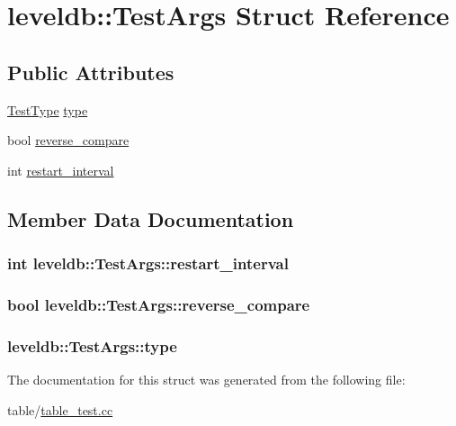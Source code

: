 \hypertarget{structleveldb_1_1_test_args}{\section{leveldb\-:\-:Test\-Args Struct Reference}
\label{structleveldb_1_1_test_args}
}
\subsection*{Public Attributes}
\begin{DoxyCompactItemize}
\item 
\hyperlink{namespaceleveldb_aefcb8349b9101fe6eeff98a1682f1342}{Test\-Type} \hyperlink{structleveldb_1_1_test_args_a1c2c14e2506bf6c238a2685c38eb16ac}{type}
\item 
bool \hyperlink{structleveldb_1_1_test_args_ab4c8bef944a4ddf845378f1fce2b6c22}{reverse\-\_\-compare}
\item 
int \hyperlink{structleveldb_1_1_test_args_a233f5e5e56ff872e26f543585824df1d}{restart\-\_\-interval}
\end{DoxyCompactItemize}


\subsection{Member Data Documentation}
\hypertarget{structleveldb_1_1_test_args_a233f5e5e56ff872e26f543585824df1d}{
\subsubsection[{restart\-\_\-interval}]{\setlength{\rightskip}{0pt plus 5cm}int leveldb\-::\-Test\-Args\-::restart\-\_\-interval}}\label{structleveldb_1_1_test_args_a233f5e5e56ff872e26f543585824df1d}
\hypertarget{structleveldb_1_1_test_args_ab4c8bef944a4ddf845378f1fce2b6c22}{
\subsubsection[{reverse\-\_\-compare}]{\setlength{\rightskip}{0pt plus 5cm}bool leveldb\-::\-Test\-Args\-::reverse\-\_\-compare}}\label{structleveldb_1_1_test_args_ab4c8bef944a4ddf845378f1fce2b6c22}
\hypertarget{structleveldb_1_1_test_args_a1c2c14e2506bf6c238a2685c38eb16ac}{
\subsubsection[{type}]{ leveldb\-::\-Test\-Args\-::type}}\label{structleveldb_1_1_test_args_a1c2c14e2506bf6c238a2685c38eb16ac}


The documentation for this struct was generated from the following file\-:\begin{DoxyCompactItemize}
\item 
table/\hyperlink{table__test_8cc}{table\-\_\-test.\-cc}\end{DoxyCompactItemize}
